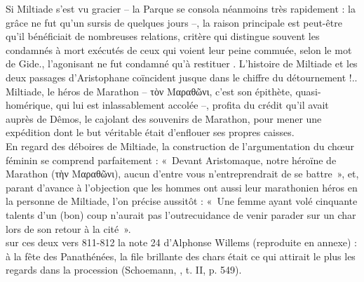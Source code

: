 {{Si Miltiade s'est vu gracier -- la Parque se consola néanmoins très rapidement : la grâce ne fut qu'un sursis de quelques jours --, la raison principale est peut-être qu'il bénéficiait de nombreuses relations, critère qui distingue souvent les condamnés à mort exécutés de ceux qui voient leur peine commuée, selon le mot de Gide.}, l'agonisant ne fut condamné qu'à restituer .
L'histoire de Miltiade et les deux passages d'Aristophane coïncident jusque dans le chiffre du détournement !..
Miltiade, le héros de Marathon -- τὸν Μαραθῶνι, c'est son épithète, quasi-homérique, qui lui est inlassablement accolée --, profita du crédit qu'il avait auprès de Dêmos, le cajolant des souvenirs de Marathon, pour mener une expédition dont le but véritable était d'enflouer ses propres caisses.\\
En regard des déboires de Miltiade, la construction de l'argumentation du chœur féminin se comprend parfaitement : «~Devant Aristomaque, notre héroïne de Marathon (τὴν Μαραθῶνι), aucun d'entre vous n'entreprendrait de se battre~», et, parant d'avance à l'objection que les hommes ont aussi leur marathonien héros en la personne de Miltiade, l'on précise aussitôt : «~Une femme ayant volé cinquante talents d'un (bon) coup n'aurait pas l'outrecuidance de venir parader sur un char lors de son retour à la cité~».\\
 sur ces deux vers 811-812 la note 24 d'Alphonse Willems (reproduite en annexe) : à la fête des Panathénées, la file brillante des chars était ce qui attirait le plus les regards dans la procession (Schoemann, , t. II, p. 549).}
